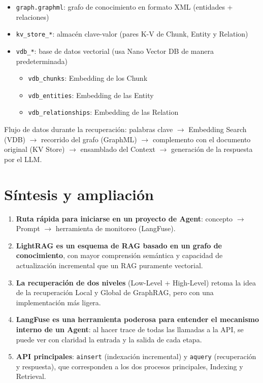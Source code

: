 \documentclass[a4paper]{article}
\begin{document}
\begin{itemize}
    \item \texttt{graph.graphml}: grafo de conocimiento en formato XML (entidades + relaciones)
    \item \texttt{kv\_store\_*}: almacén clave-valor (pares K-V de Chunk, Entity y Relation)
    \item \texttt{vdb\_*}: base de datos vectorial (usa Nano Vector DB de manera predeterminada)
    \begin{itemize}
        \item \texttt{vdb\_chunks}: Embedding de los Chunk
        \item \texttt{vdb\_entities}: Embedding de las Entity
        \item \texttt{vdb\_relationships}: Embedding de las Relation
    \end{itemize}
\end{itemize}

Flujo de datos durante la recuperación: palabras clave $\rightarrow$ Embedding Search (VDB) $\rightarrow$ recorrido del grafo (GraphML) $\rightarrow$ complemento con el documento original (KV Store) $\rightarrow$ ensamblado del Context $\rightarrow$ generación de la respuesta por el LLM.

\section{Síntesis y ampliación}

\begin{enumerate}
    \item \textbf{Ruta rápida para iniciarse en un proyecto de Agent}: concepto $\rightarrow$ Prompt $\rightarrow$ herramienta de monitoreo (LangFuse).
    \item \textbf{LightRAG es un esquema de RAG basado en un grafo de conocimiento}, con mayor comprensión semántica y capacidad de actualización incremental que un RAG puramente vectorial.
    \item \textbf{La recuperación de dos niveles} (Low-Level + High-Level) retoma la idea de la recuperación Local y Global de GraphRAG, pero con una implementación más ligera.
    \item \textbf{LangFuse es una herramienta poderosa para entender el mecanismo interno de un Agent}: al hacer trace de todas las llamadas a la API, se puede ver con claridad la entrada y la salida de cada etapa.
    \item \textbf{API principales}: \texttt{ainsert} (indexación incremental) y \texttt{aquery} (recuperación y respuesta), que corresponden a los dos procesos principales, Indexing y Retrieval.
\end{enumerate}
\end{document}
